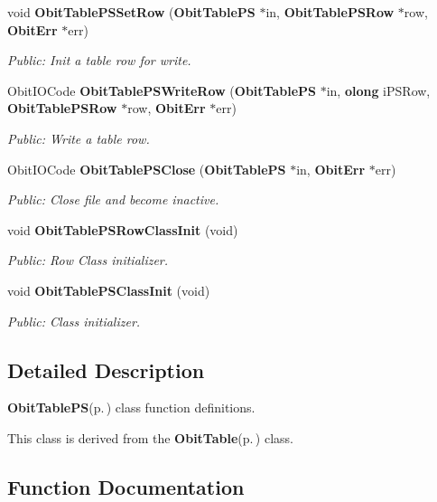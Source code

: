 \begin{CompactItemize}
void {\bf Obit\-Table\-PSSet\-Row} ({\bf Obit\-Table\-PS} $\ast$in, {\bf Obit\-Table\-PSRow} $\ast$row, {\bf Obit\-Err} $\ast$err)
\begin{CompactList}\small\item\em Public: Init a table row for write. \item\end{CompactList}\item 
Obit\-IOCode {\bf Obit\-Table\-PSWrite\-Row} ({\bf Obit\-Table\-PS} $\ast$in, {\bf olong} i\-PSRow, {\bf Obit\-Table\-PSRow} $\ast$row, {\bf Obit\-Err} $\ast$err)
\begin{CompactList}\small\item\em Public: Write a table row. \item\end{CompactList}\item 
Obit\-IOCode {\bf Obit\-Table\-PSClose} ({\bf Obit\-Table\-PS} $\ast$in, {\bf Obit\-Err} $\ast$err)
\begin{CompactList}\small\item\em Public: Close file and become inactive. \item\end{CompactList}\item 
void {\bf Obit\-Table\-PSRow\-Class\-Init} (void)
\begin{CompactList}\small\item\em Public: Row Class initializer. \item\end{CompactList}\item 
void {\bf Obit\-Table\-PSClass\-Init} (void)
\begin{CompactList}\small\item\em Public: Class initializer. \item\end{CompactList}\end{CompactItemize}


\subsection{Detailed Description}
{\bf Obit\-Table\-PS}{\rm (p.\,\pageref{structObitTablePS})} class function definitions. 

This class is derived from the {\bf Obit\-Table}{\rm (p.\,\pageref{structObitTable})} class.

\subsection{Function Documentation}
